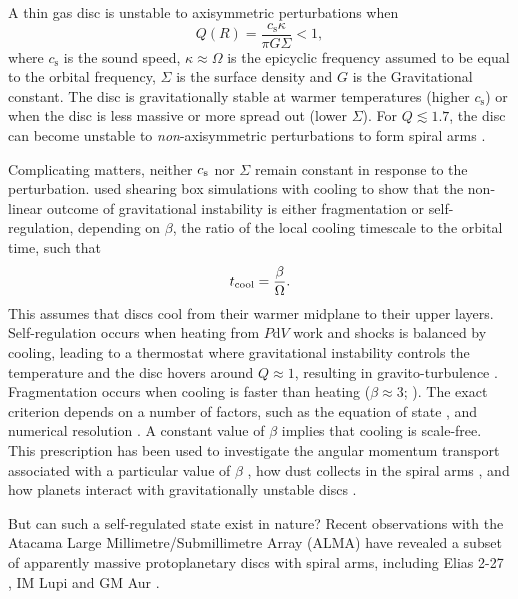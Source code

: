 \documentclass[usenatbib]{mnras}
\begin{document}
A thin gas disc is unstable to axisymmetric perturbations when
\begin{equation}
    \label{eq:Toomre}
    Q(R) = \frac{c_{\text{s}} \kappa}{\pi G \Sigma} < 1,
\end{equation}
where $c_\text{s}$ is the sound speed, $\kappa \approx \Omega$ is the epicyclic frequency assumed to be equal to the orbital frequency, $\Sigma$ is the surface density \citep{1964Toomre} and $G$ is the Gravitational constant. The disc is gravitationally stable at warmer temperatures (higher $c_\text{s}$) or when the disc is less massive or more spread out (lower $\Sigma$). For $Q \lesssim 1.7$, the disc can become unstable to \emph{non}-axisymmetric perturbations to form spiral arms \citep{2007Durisen}. 

Complicating matters, neither $c_{\rm s}$ nor $\Sigma$ remain constant in response to the perturbation. \citet{2001Gammie} used shearing box simulations with cooling to show that the non-linear outcome of gravitational instability is either fragmentation or self-regulation, depending on $\beta$, the ratio of the local cooling timescale to the orbital time, such that
\begin{equation}
    \label{eq:tcool}
    t_{\rm cool} = \frac{\beta}{\Omega}.
\end{equation}
This assumes that discs cool from their warmer midplane to their upper layers.
Self-regulation occurs when heating from $P\mathrm{d}V$ work and shocks is balanced by cooling, leading to a thermostat where gravitational instability controls the temperature and the disc hovers around $Q\approx 1$, resulting in gravito-turbulence \citep{2003bRice,2004Lodato}. Fragmentation occurs when cooling is faster than heating ($\beta \approx 3$; \citealt{2001Gammie}). The exact criterion depends on a number of factors, such as the equation of state \citep{2005Rice}, and numerical resolution \citep{2010Meru,2011Lodato,2012Meru}. A constant value of $\beta$ implies that cooling is scale-free. This prescription has been used to investigate the angular momentum transport associated with a particular value of $\beta$ \citep{2001Gammie,2009Cossins}, how dust collects in the spiral arms \citep{2004Rice,2006Rice,2012Gibbons,2016Booth,2021Baehr,2022Baehr,2024Rowther}, and how planets interact with gravitationally unstable discs \citep{2011Baruteau,2015Malik,2020Rowther,2020bRowther,2022bRowther}. 

But can such a self-regulated state exist in nature? Recent observations with the Atacama Large Millimetre/Submillimetre Array (ALMA) have revealed a subset of apparently massive protoplanetary discs with spiral arms, including Elias 2-27 \citep{2016Perez,2017Meru,2018bForgan,2018Hall,2018bHuang,2021Veronesi}, IM Lupi and GM Aur \citep{2023Lodato}.
\end{document}

